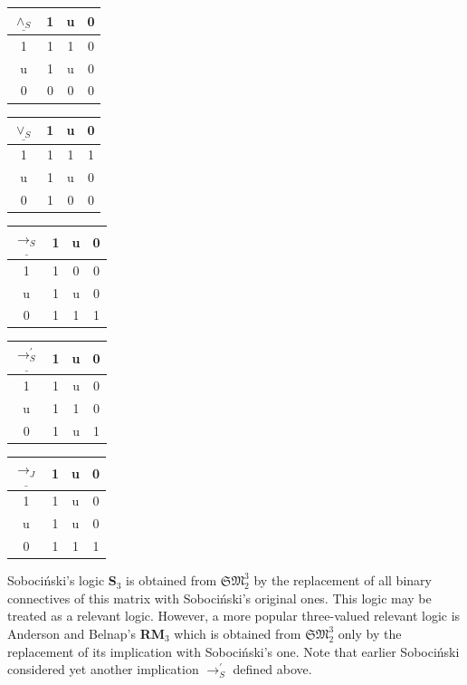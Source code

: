 \documentclass[10pt,a4paper]{article}
\theoremstyle{definition}
\newcommand{\3}{\vspace{.3in}}
\newcommand{\2}{\vspace{.2in}}
\newcommand{\1}{\vspace{.1in}}
\newcommand{\5}{\vspace{.05in}}
\begin{document}
\begin{center}
	\begin{tabular}{|c|ccc|}
		\hline
		$\underline{\wedge_S} $ & 1 & u & 0 \\
		\hline
		1 & 1 & 1 & 0 \\
		u & 1 & u & 0 \\
		0 & 0 & 0 & 0 \\
		\hline
	\end{tabular}
	\begin{tabular}{|c|ccc|}
		\hline$\underline{\vee_S} $ & 1 & u & 0 \\\hline
		1 & 1 & 1 & 1 \\
		u & 1 & u & 0 \\
		0 & 1 & 0 & 0 \\\hline
	\end{tabular}
	\begin{tabular}{|c|ccc|}
		\hline
		$\underline{\rightarrow_S} $ & 1 & u & 0 \\
		\hline
		1 & 1 & 0 & 0 \\
		u & 1 & u & 0 \\
		0 & 1 & 1 & 1 \\
		\hline
	\end{tabular}
	\end{center} 
	\begin{center}
	\begin{tabular}{|c|ccc|}
		\hline
		$\underline{\rightarrow_S^\prime} $ & 1 & u & 0 \\
		\hline
		1 & 1 & u & 0 \\
		u & 1 & 1 & 0 \\
		0 & 1 & u & 1 \\
		\hline
	\end{tabular}
	\begin{tabular}{|c|ccc|}
		\hline$\underline{\rightarrow_J} $ & 1 & u & 0 \\\hline
		1 & 1 & u & 0 \\
		u & 1 & u & 0 \\
		0 & 1 & 1 & 1 \\\hline
	\end{tabular}
\end{center}

Soboci\'nski's logic {\bf S$_3$} is obtained from $\mathfrak{SM}_2^3$ by the replacement of all binary connectives of this matrix with Soboci\'nski's original ones. This logic may be treated as a relevant logic. However, a more popular three-valued relevant logic is Anderson and Belnap's {\bf RM$_3$} \cite{EntailmentI} which is obtained from $\mathfrak{SM}_2^3$ only by the replacement of its implication with Soboci\'nski's one. Note that earlier Soboci\'nski \cite{Sobocinski1} considered yet another implication $ \rightarrow_S^\prime $ defined above.
\end{document}

